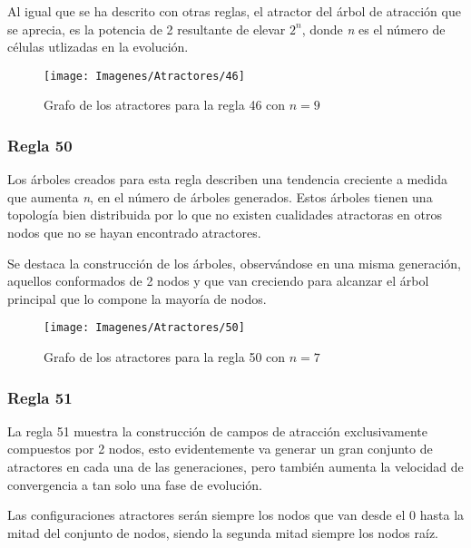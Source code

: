 \documentclass[]{article}
\begin{document}
				\hfill\break
				\justifying
				Al igual que se ha descrito con otras reglas, el atractor del árbol de atracción que se aprecia, es la potencia de 2 resultante de elevar $2^n$, donde \textit{n} es el número de células utlizadas en la evolución.
				
				\hfill\break
				\hfill\break
				\begin{figure}[!h]
					\centering
					\texttt{[image: Imagenes/Atractores/46]}
					\caption{Grafo de los atractores para la regla 46 con $n=9$}
					\label{Regla_46}
				\end{figure}
				
			\newpage
			\subsubsection{Regla 50}
				\justifying
				Los árboles creados para esta regla describen una tendencia creciente a medida que aumenta \textit{n}, en el número de árboles generados. Estos árboles tienen una topología bien distribuida por lo que no existen cualidades atractoras en otros nodos que no se hayan encontrado atractores.
				
				\hfill\break
				\justifying
				Se destaca la construcción de los árboles, observándose en una misma generación, aquellos conformados de 2 nodos y que van creciendo para alcanzar el árbol principal que lo compone la mayoría de nodos.
				
				\hfill\break
				\hfill\break
				\begin{figure}[!h]
					\centering
					\texttt{[image: Imagenes/Atractores/50]}
					\caption{Grafo de los atractores para la regla 50 con $n=7$}
					\label{Regla_50}
				\end{figure}
			
			\newpage
			\subsubsection{Regla 51}
				\justifying
				La regla 51 muestra la construcción de campos de atracción exclusivamente compuestos por 2 nodos, esto evidentemente va generar un gran conjunto de atractores en cada una de las generaciones, pero también aumenta la velocidad de convergencia a tan solo una fase de evolución.
				
				\hfill\break
				\justifying
				Las configuraciones atractores serán siempre los nodos que van desde el 0 hasta la mitad del conjunto de nodos, siendo la segunda mitad siempre los nodos raíz.
				
\end{document}
